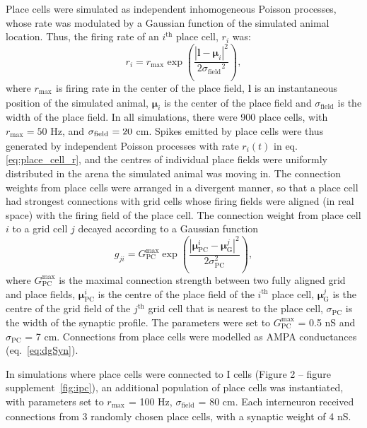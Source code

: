 \documentclass[a4paper,12pt]{article}
\newcommand{\ssc}[3]{\ensuremath{#1_{\text{#2}_{\text{#3}}}}}
\newcommand{\sigmasub}[1]{\ssc{\sigma}{\scriptsize{#1}}{}}
\begin{document}
Place cells were simulated as independent inhomogeneous Poisson processes,
whose rate was modulated by a Gaussian function of the simulated animal
location. Thus, the firing rate of an $i^{\text{th}}$ place cell, $r_i$ was:
\begin{equation}
    r_i = \ssc{r}{max}{} \exp\left( \frac{|\mathbf{l} - \bm{\mu}_i|^2}{2
            \ssc{\sigma}{field}{}^2} \right),
    \label{eq:place_cell_r}
\end{equation}
where $\ssc{r}{max}{}$ is firing rate in the center of the place field,
$\mathbf{l}$ is an instantaneous position of the simulated animal,
$\bm{\mu}_i$ is the center of the place field and
$\ssc{\sigma}{field}{}$ is the width of the place field.
In all simulations,
there were 900 place cells, with $\ssc{r}{max}{} = 50$ Hz, and $\sigmasub{field}
= 20$ cm.  Spikes emitted by place cells were thus generated by independent
Poisson processes with rate $r_i(t)$ in eq. \eqref{eq:place_cell_r}, and the
centres of individual place fields were uniformly distributed in the arena the
simulated animal was moving in.
The connection weights from place cells were arranged in a divergent
manner, so that a place cell had strongest connections with grid cells whose
firing fields were aligned (in real space) with the firing field of the place
cell. The connection weight from place
cell $i$ to a grid cell $j$ decayed according to a Gaussian function
\begin{equation}
    g_{ji} = G_{\text{PC}}^{\text{max}} \exp\left( \frac{|\bm{\mu}_{\text{PC}}^{i} -
    \bm{\mu}_{\text{G}}^j|^2}{2\sigma_\text{PC}^2} \right),
    \label{eq:TG_pc_diverg_conn}
\end{equation}
where $G_{\text{PC}}^{\text{max}}$ is the maximal connection strength between
two fully aligned grid and place fields, $\bm{\mu}_{\text{PC}}^{i}$ is the
centre of the place field of the $i^{\text{th}}$ place cell,
$\bm{\mu}_{\text{G}}^j$ is the centre of the grid field of the $j^{\text{th}}$
grid cell that is nearest to the place cell, $\sigma_\text{PC}$ is the width of
the synaptic profile. The parameters were set to $G_{\text{PC}}^{\text{max}}$ =
0.5 nS and $\sigma_\text{PC}$ = 7 cm. Connections from place cells were modelled
as AMPA conductances (eq.~\ref{eq:dgSyn}).

In simulations where place cells were connected to I cells (Figure 2 -- figure
supplement~\ref{fig:ipc}), an additional population of place cells was
instantiated, with parameters set to \ssc{r}{max}{} = 100 Hz,
\ssc{\sigma}{field}{} = 80 cm.  Each interneuron received connections from 3
randomly chosen place cells, with a synaptic weight of 4 nS.
\end{document}
